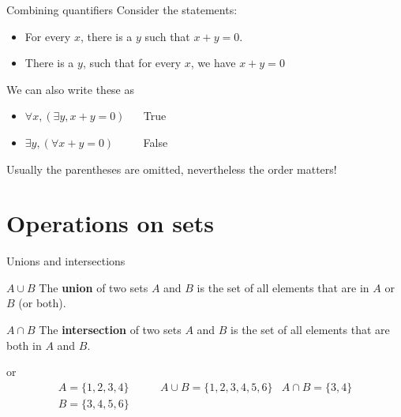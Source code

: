 \documentclass{beamer}
\def\black{\color{black}~}
\def\bl[#1]#2{\begin{block}{#1}#2\end{block}}
\begin{document}
\begin{frame}{Combining quantifiers}
Consider the statements:
\begin{itemize}
\item For every $x$, there is a $y$ such that $x+y=0$.
\item There is a $y$, such that for every $x$, we have $x+y=0$
\end{itemize}\pause

We can also write these as

\begin{itemize}
\item $\forall x, (\exists y, x+y=0)$ $\quad$ True
\item $\exists y, (\forall x+y=0)$ $\qquad$ False
\end{itemize}\pause

Usually the parentheses are omitted, nevertheless the order matters!

\end{frame}

\section{Operations on sets}

\begin{frame}{Unions and intersections}
\bl[$A\cup B$]{
The \textbf{union} of two sets $A$ and $B$ is the set of all elements that are in $A$ or $B$ (or both). 
}

\bl[$A\cap B$]{
The \textbf{intersection} of two sets $A$ and $B$ is the set of all elements that are both in $A$ and $B$.
}

\begin{figure}
\center
{}
\end{figure}
or \pause
\begin{align*}
A=\{1,2,3,4\}\qquad & A\cup B=\{1,2,3,4,5,6\}& A\cap B=\{3,4\}\\
B=\{3,4,5,6\}\qquad& &
\end{align*}
\end{frame}
\end{document}
